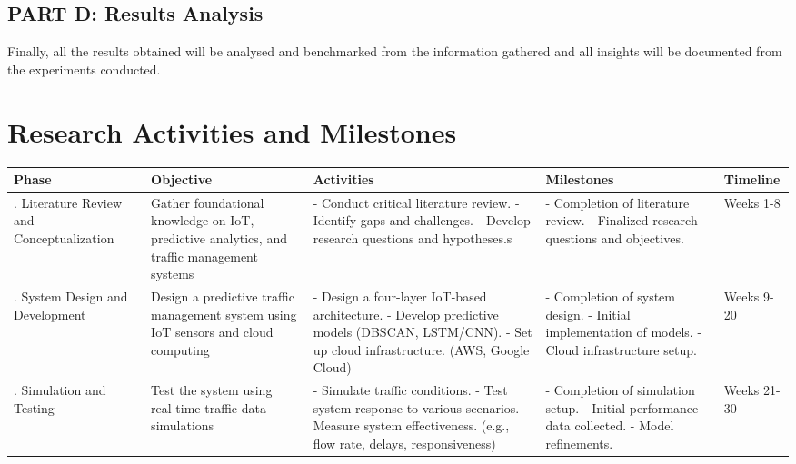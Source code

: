 \documentclass[12pt,a4paper]{article}
\begin{document}
\subsection{PART D: Results Analysis}

 

Finally, all the results obtained will be analysed and benchmarked from the information gathered and all insights will be documented from the experiments conducted.
\newpage

\section{Research Activities and Milestones}

\begin{table}[h]
    \centering
\begin{tabularx}{1.1\textwidth} { 
  | >{\raggedright\arraybackslash}X 
  || >{\raggedright\arraybackslash}X
  | >{\raggedright\arraybackslash}X
  | >{\raggedright\arraybackslash}X
  | >{\raggedright\arraybackslash}X
  |} 
 \hline
 
Phase & Objective & Activities & Milestones & Timeline \\ 
\hline
\hline
1. Literature Review and Conceptualization & Gather foundational knowledge on IoT, predictive analytics, and traffic management systems & - Conduct critical literature review.\newline
- Identify gaps and challenges.\newline
- Develop research questions and hypotheses.s & - Completion of literature review.\newline
- Finalized research questions and objectives. & Weeks 1-8 \\ 
\hline
2. System Design and Development & Design a predictive traffic management system using IoT sensors and cloud computing & - Design a four-layer IoT-based architecture.\newline
- Develop predictive models (DBSCAN, LSTM/CNN).\newline
- Set up cloud infrastructure. (AWS, Google Cloud) & - Completion of system design.
- Initial implementation of models.\newline
- Cloud infrastructure setup. & Weeks 9-20 \\ 
\hline
3. Simulation and Testing & Test the system using real-time traffic data simulations & - Simulate traffic conditions.\newline
- Test system response to various scenarios.\newline
- Measure system effectiveness. (e.g., flow rate, delays, responsiveness)& - Completion of simulation setup.\newline
- Initial performance data collected.\newline
- Model refinements. & Weeks 21-30 \\ 
\hline
\end{tabularx}
\end{table}
\newpage
\end{document}
